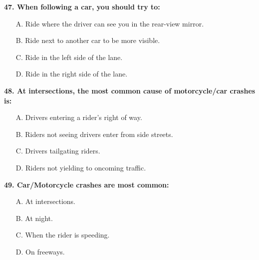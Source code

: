\begin{minipage}{\linewidth}
\vspace{1em}\noindent\textbf{47. When following a car, you should try to:}

\begin{itemize}[nosep,leftmargin=2em]
\item [A.] Ride where the driver can see you in the rear-view mirror.
\item [B.] Ride next to another car to be more visible.
\item [C.] Ride in the left side of the lane.
\item [D.] Ride in the right side of the lane.

\end{itemize}
\end{minipage}


\begin{minipage}{\linewidth}
\vspace{1em}\noindent\textbf{48. At intersections, the most common cause of motorcycle/car crashes is:}

\begin{itemize}[nosep,leftmargin=2em]
\item [A.] Drivers entering a rider's right of way.
\item [B.] Riders not seeing drivers enter from side streets.
\item [C.] Drivers tailgating riders.
\item [D.] Riders not yielding to oncoming traffic.

\end{itemize}
\end{minipage}


\begin{minipage}{\linewidth}
\vspace{1em}\noindent\textbf{49. Car/Motorcycle crashes are most common:}

\begin{itemize}[nosep,leftmargin=2em]
\item [A.] At intersections.
\item [B.] At night.
\item [C.] When the rider is speeding.
\item [D.] On freeways.

\end{itemize}
\end{minipage}



